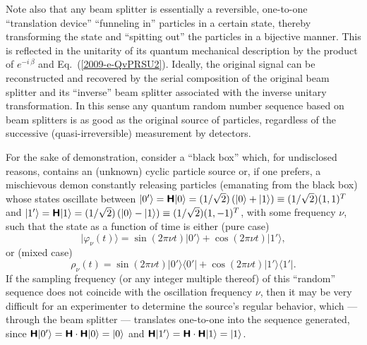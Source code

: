 \documentclass[%
 preprint,
 showpacs,
 showkeys,
 preprintnumbers,
 amsmath,amssymb,
 aps,
 prl,
  longbibliography,
 ]{revtex4-1}
\begin{document}
Note also that any beam splitter is essentially a reversible, one-to-one
``translation device'' ``funneling in'' particles in a certain state, thereby transforming
the state and ``spitting out'' the particles in a bijective manner.
This is reflected in the unitarity of its quantum mechanical description
by the product of $e^{-i\,\beta}$ and  Eq.~(\ref{2009-e-QvPRSU2}).
Ideally, the original signal can be reconstructed and recovered by the serial composition
of the original beam splitter and its ``inverse'' beam splitter associated with the inverse unitary transformation.
In this sense
any quantum random number sequence based on beam splitters is as good as the original source of particles, regardless of the successive (quasi-irreversible) measurement by detectors.

For the sake of demonstration, consider a ``black box'' which,
for undisclosed reasons, contains an (unknown) cyclic particle source or,
if one prefers, a mischievous demon  constantly
releasing particles (emanating from the black box) whose states oscillate
between
$\vert 0' \rangle =
\textsf{\textbf{H}} \vert 0 \rangle =
({1}/{\sqrt{2}}) \left( \vert 0 \rangle
  + \vert 1  \rangle \right) \equiv ({1}/{\sqrt{2}}) (1,1)^T$
and
$\vert 1' \rangle =
\textsf{\textbf{H}} \vert 1 \rangle =
({1}/{\sqrt{2}}) \left( \vert 0 \rangle
  - \vert 1  \rangle \right) \equiv ({1}/{\sqrt{2}}) (1,-1)^T
$, with some frequency $\nu$, such that the state as a function of time is
either (pure case)
\begin{equation}
\vert \varphi_\nu (t) \rangle =  \sin (2\pi \nu t)
\vert 0' \rangle
+
 \cos (2\pi \nu t)
\vert 1' \rangle ,
\end{equation}
or (mixed case)
\begin{equation}
\rho_\nu (t)  =  \sin (2\pi \nu t)
\vert 0' \rangle \langle 0'  \vert
+
 \cos (2\pi \nu t)
\vert 1' \rangle \langle 1'  \vert
.
\end{equation}
If the sampling frequency (or any integer multiple thereof)
of this ``random'' sequence does not coincide with the oscillation frequency $\nu$,
then it may be very difficult for an experimenter to determine the source's regular behavior,
which --- through the beam splitter ---  translates one-to-one into the sequence generated,
since
$\textsf{\textbf{H}}
\vert 0' \rangle
= \textsf{\textbf{H}} \cdot \textsf{\textbf{H}}  \vert 0 \rangle =
 \vert 0 \rangle
$
and
$\textsf{\textbf{H}}
\vert 1' \rangle
=        \textsf{\textbf{H}} \cdot \textsf{\textbf{H}}  \vert 1 \rangle =
\vert 1 \rangle
$.
\end{document}

